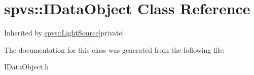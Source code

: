 \hypertarget{classspvs_1_1_i_data_object}{\section{spvs\-:\-:I\-Data\-Object Class Reference}
\label{classspvs_1_1_i_data_object}
}


Inherited by \hyperlink{classspvs_1_1_light_source}{spvs\-::\-Light\-Source}{\ttfamily  \mbox{[}private\mbox{]}}.



The documentation for this class was generated from the following file\-:\begin{DoxyCompactItemize}
\item 
I\-Data\-Object.\-h\end{DoxyCompactItemize}
